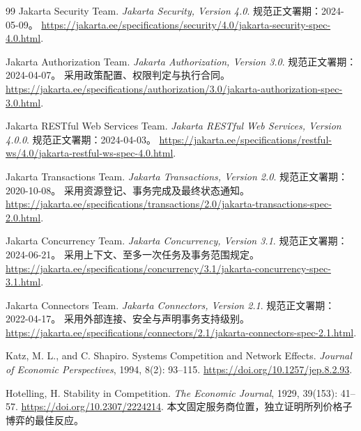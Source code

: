 \documentclass[UTF8,12pt,a4paper,openany,fontset=none,zihao=false]{ctexrep}
\theoremstyle{definition}
\newcommand{\1}{\mathbf 1}
\begin{document}
\begin{thebibliography}{99}
Jakarta Security Team.
\emph{Jakarta Security, Version 4.0}.
规范正文署期：2024-05-09。
\url{https://jakarta.ee/specifications/security/4.0/jakarta-security-spec-4.0.html}.

Jakarta Authorization Team.
\emph{Jakarta Authorization, Version 3.0}.
规范正文署期：2024-04-07。
采用政策配置、权限判定与执行合同。
\url{https://jakarta.ee/specifications/authorization/3.0/jakarta-authorization-spec-3.0.html}.

Jakarta RESTful Web Services Team.
\emph{Jakarta RESTful Web Services, Version 4.0.0}.
规范正文署期：2024-04-03。
\url{https://jakarta.ee/specifications/restful-ws/4.0/jakarta-restful-ws-spec-4.0.html}.

Jakarta Transactions Team.
\emph{Jakarta Transactions, Version 2.0}.
规范正文署期：2020-10-08。
采用资源登记、事务完成及最终状态通知。
\url{https://jakarta.ee/specifications/transactions/2.0/jakarta-transactions-spec-2.0.html}.

Jakarta Concurrency Team.
\emph{Jakarta Concurrency, Version 3.1}.
规范正文署期：2024-06-21。
采用上下文、至多一次任务及事务范围规定。
\url{https://jakarta.ee/specifications/concurrency/3.1/jakarta-concurrency-spec-3.1.html}.

Jakarta Connectors Team.
\emph{Jakarta Connectors, Version 2.1}.
规范正文署期：2022-04-17。
采用外部连接、安全与声明事务支持级别。
\url{https://jakarta.ee/specifications/connectors/2.1/jakarta-connectors-spec-2.1.html}.

Katz, M. L., and C. Shapiro.
Systems Competition and Network Effects.
\emph{Journal of Economic Perspectives}, 1994, 8(2): 93--115.
\url{https://doi.org/10.1257/jep.8.2.93}.

Hotelling, H.
Stability in Competition.
\emph{The Economic Journal}, 1929, 39(153): 41--57.
\url{https://doi.org/10.2307/2224214}.
本文固定服务商位置，独立证明所列价格子博弈的最佳反应。

\end{thebibliography}
\end{document}
